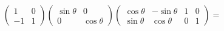 ﻿\documentclass{book} \usepackage{exsheets} \usepackage{xeCJK}
\begin{document}
\begin{solution}
\begin{align*}
\begin{pmatrix}
                                                                                                                                                                                                             1&0\\
                                                                                                                                                                                                             -1&1
                                                                                                                                                                                                           \end{pmatrix}
                                                                                                                                                                                                                 \begin{pmatrix}
                                                                                                                                                                                                                   \sin\theta&0\\
                                                                                                                                                                                                                   0&\cos\theta
                                                                                                                                                                                                                 \end{pmatrix}
                                                                                                                                                                                                                      \begin{pmatrix}
                                                                                                                                                                                                                        \cos\theta&-\sin\theta&1&0\\
                                                                                                                                                                                                                        \sin\theta&\cos\theta&0&1
                                                                                                                                                                                                                      \end{pmatrix}=

\end{align*}
\end{solution}
\end{document}
